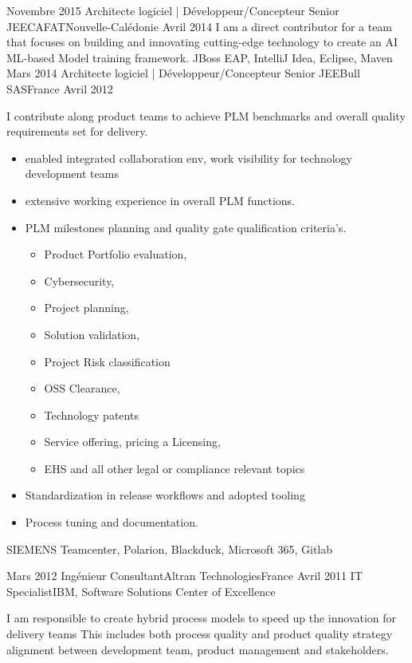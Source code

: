 \begin{experiences}
  \experience
    {Novembre 2015} {Architecte logiciel | Développeur/Concepteur Senior JEE}{CAFAT}{Nouvelle-Calédonie}
    {Avril 2014}    {
                    I am a direct contributor for a team that focuses on building and innovating cutting-edge technology to create an AI ML-based Model training framework.
                    }
                    {JBoss EAP, IntelliJ Idea, Eclipse, Maven}
  \emptySeparator
  \experience
    {Mars 2014}     {Architecte logiciel | Développeur/Concepteur Senior JEE}{Bull SAS}{France}
    {Avril 2012}    {
I contribute along  product teams to achieve PLM benchmarks and overall quality requirements set for delivery.
\begin{itemize}
    \item enabled integrated collaboration env, work visibility for technology development teams
    \item extensive working experience in overall PLM functions.
    \item PLM milestones planning and quality gate qualification criteria's.
    \begin{itemize}
        \item          Product Portfolio evaluation,
        \item Cybersecurity,
        \item Project planning,
        \item Solution validation,
        \item Project Risk classification
        \item OSS Clearance,
        \item Technology patents
        \item Service offering, pricing a Licensing,
        \item EHS and all other legal or compliance relevant topics
    \end{itemize}
    \item Standardization in release workflows and adopted tooling
    \item Process tuning and documentation.
\end{itemize}

     \begin{itemize}

     \end{itemize}
                    }
                    {SIEMENS Teamcenter, Polarion, Blackduck, Microsoft 365, Gitlab} 
               
  \emptySeparator
  \consultantexperience
  {Mars 2012}       {Ingénieur Consultant}{Altran Technologies}{France}
  {Avril 2011}      {IT Specialist}{IBM, Software Solutions Center of Excellence}
                    {
               I am responsible to create hybrid process models to speed up the innovation for delivery teams
This includes both process quality and product quality strategy alignment between development team, product management and stakeholders.

}
\end{experiences}
